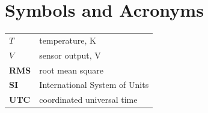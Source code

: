 \chapter*{Symbols and Acronyms}
\begin{tabular}{>{\bfseries}p{}p{}}
  $T$ & temperature, K \\
  $V$ & sensor output, V \\
  RMS & root mean square \\
  SI & International System of Units \\
  UTC & coordinated universal time \\
\end{tabular}

